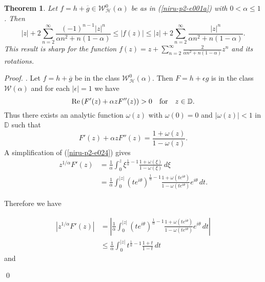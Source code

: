 \documentclass[a4paper,12pt]{amsart}
\theoremstyle{plain}
\newtheorem{thm}[equation]{Theorem}
\theoremstyle{definition}
\newenvironment{pf}[1][]{ \vskip 3mm
 \noindent
 \ifthenelse{\equal{#1}{}}  {{\slshape Proof. }}  {{\slshape #1.} } }{\qed\bigskip}
\begin{document}
\begin{thm}\label{niru-p2-t025}
Let $f = h + \overline{g} \in \mathcal{W}^0_{\mathcal{H}}(\alpha)$  be as in (\ref{niru-p2-e001a}) with  $0<\alpha \leq 1$. Then
\begin{equation}\label{niru-p2-e021}
|z| + 2\sum_{n = 2}^{\infty}\frac{(-1)^{n-1} |z|^n}{\alpha n^2 + n(1 - \alpha)} \leq |f(z)|\leq |z| + 2\sum_{n = 2}^{\infty}\frac{|z|^n}{\alpha n^2 + n(1 - \alpha)}.
\end{equation}
This result is sharp for the function $f(z) = z + \sum _{n = 2}^{\infty}\frac{2}{\alpha n^2 + n(1 - \alpha)}z^n$ and its rotations.
\end{thm}

\begin{pf}
Let $f= h + \overline{g}$ be in the class $\mathcal{W}^0_{\mathcal{H}}(\alpha)$. Then $ F = h + \epsilon g$ is in the class $\mathcal{W}(\alpha)$ and for each $|\epsilon| = 1$ we have
\begin{equation}\label{niru-p2-e023aa}
{\rm Re\,}(F'(z) + \alpha z F''(z)) > 0 \quad \mbox{for}\quad z\in\mathbb{D}.
\end{equation}
Thus there exists an analytic function $\omega(z)$  with $\omega(0)=0$ and $|\omega(z)|<1 $ in $\mathbb{D}$ such that
\begin{equation}\label{niru-p2-e024}
F'(z) + \alpha z F''(z) = \frac{1 + \omega(z)}{1 - \omega(z)}.
\end{equation}
A simplification of (\ref{niru-p2-e024}) gives
\begin{align*}\label{niru-p2-e025}
 z^{1/ \alpha} F'(z) &= \frac{1}{\alpha}\int_{0}^{z} {\xi}^{\frac{1}{\alpha} -1} \frac{1 + \omega(\xi)}{1 - \omega(\xi)}\, d\xi\\ \nonumber
& =\frac{1}{\alpha}\int_{0}^{|z|}{(t e^{i \theta})}^{\frac{1}{\alpha} -1}\frac{1 + \omega(t e^{i \theta})}{1 - \omega(t e^{i \theta})} e^{i\theta}\, dt.
\end{align*}

\noindent Therefore we have

\begin{align*}
|z^{1/ \alpha} F'(z)|&=\left|\frac{1}{\alpha}\int_{0}^{|z|}{(t e^{i \theta})}^{\frac{1}{\alpha} -1}\frac{1 +\omega(t e^{i\theta})}{1-\omega(t e^{i \theta})} e^{i\theta}\,dt \right|\\
& \leq \frac{1}{\alpha}\int_{0}^{|z|}{t }^{\frac{1}{\alpha} -1}\frac{1 + t}{1-t}\,dt
\end{align*}
and\


\end{pf}
\end{document}
